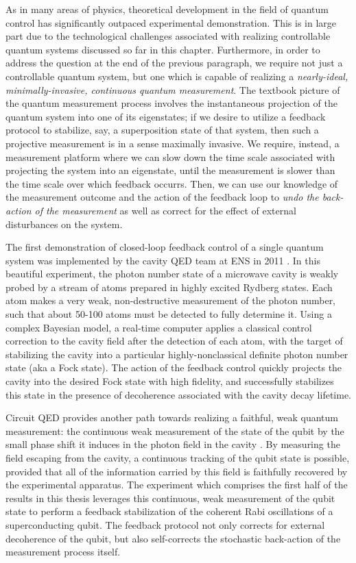 As in many areas of physics, theoretical development in the field of quantum control has significantly outpaced experimental demonstration.  This is in large part due to the technological challenges associated with realizing controllable quantum systems discussed so far in this chapter.  Furthermore, in order to address the question at the end of the previous paragraph, we require not just a controllable quantum system, but one which is capable of realizing a \textit{nearly-ideal, minimally-invasive, continuous quantum measurement}.  The textbook picture of the quantum measurement process involves the instantaneous projection of the quantum system into one of its eigenstates; if we desire to utilize a feedback protocol to stabilize, say, a superposition state of that system, then such a projective measurement is in a sense maximally invasive.  We require, instead, a measurement platform where we can slow down the time scale associated with projecting the system into an eigenstate, until the measurement is slower than the time scale over which feedback occurrs.  Then, we can use our knowledge of the measurement outcome and the action of the feedback loop to \textit{undo the back-action of the measurement} as well as correct for the effect of external disturbances on the system.

The first demonstration of closed-loop feedback control of a single quantum system was implemented by the cavity QED team at ENS in 2011 \cite{haroche_fb}.  In this beautiful experiment, the photon number state of a microwave cavity is weakly probed by a stream of atoms prepared in highly excited Rydberg states. Each atom makes a very weak, non-destructive measurement of the photon number, such that about 50-100 atoms must be detected to fully determine it.  Using a complex Bayesian model, a real-time computer applies a classical control correction to the cavity field after the detection of each atom, with the target of stabilizing the cavity into a particular highly-nonclassical definite photon number state (aka a Fock state).  The action of the feedback control quickly projects the cavity into the desired Fock state with high fidelity, and successfully stabilizes this state in the presence of decoherence associated with the cavity decay lifetime.

Circuit QED provides another path towards realizing a faithful, weak quantum measurement: the continuous weak measurement of the state of the qubit by the small phase shift it induces in the photon field in the cavity \cite{Boissonneault2009,koro11,Girvin2014}.  By measuring the field escaping from the cavity, a continuous tracking of the qubit state is possible, provided that all of the information carried by this field is faithfully recovered by the experimental apparatus.  The experiment which comprises the first half of the results in this thesis leverages this continuous, weak measurement of the qubit state to perform a feedback stabilization of the coherent Rabi oscillations of a superconducting qubit.  The feedback protocol not only corrects for external decoherence of the qubit, but also self-corrects the stochastic back-action of the measurement process itself.


